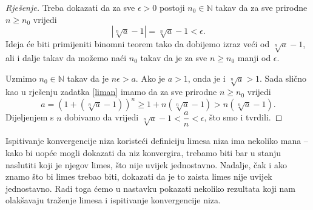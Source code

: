 \begin{proof}[Rješenje]
Treba dokazati da za sve $\epsilon>0$ postoji $n_0\in \mathbb{N}$ takav da za sve prirodne $n\geq n_0$ vrijedi
$$|\sqrt[n]{a}-1|=\sqrt[n]{a}-1<\epsilon.$$
Ideja će biti primijeniti binomni teorem tako da dobijemo izraz veći od $\sqrt[n]{a}-1$, ali i dalje takav da možemo naći $n_0$ takav da je za sve $n\geq n_0$ manji od $\epsilon$.

Uzmimo $n_0\in \mathbb{N}$ takav da je $n\epsilon>a$. Ako je $a>1$, onda je i $\sqrt[n]{a}>1$. Sada slično kao u rješenju zadatka \ref{liman} imamo da za sve prirodne $n\geq n_0$ vrijedi
$$a=\left(1+(\sqrt[n]{a}-1)\right)^n\geq 1+n(\sqrt[n]{a}-1)>n(\sqrt[n]{a}-1).$$
Dijeljenjem s $n$ dobivamo da vrijedi $\sqrt[n]{a}-1<\dfrac{a}{n}<\epsilon$, što smo i tvrdili.
\end{proof}

Ispitivanje konvergencije niza koristeći definiciju limesa niza ima nekoliko mana -- kako bi uopće mogli dokazati da niz konvergira, trebamo biti bar u stanju naslutiti koji je njegov limes, što nije uvijek jednostavno. Nadalje, čak i ako znamo što bi limes trebao biti, dokazati da je to zaista limes nije uvijek jednostavno. Radi toga ćemo u nastavku pokazati nekoliko rezultata koji nam olakšavaju traženje limesa i ispitivanje konvergencije niza.

